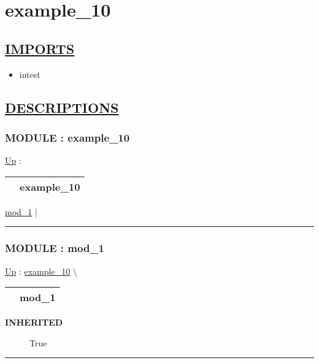 \chapter*{example\_10}
\hypertarget{ecldoc:toc:example_10}{}

\section*{\underline{IMPORTS}}
\begin{itemize}
\item intest
\end{itemize}

\section*{\underline{DESCRIPTIONS}}
\subsection*{MODULE : example\_10}
\hypertarget{ecldoc:example_10}{}
\hyperlink{ecldoc:toc:root}{Up} :

{\renewcommand{\arraystretch}{1.5}
\begin{tabularx}{\textwidth}{|>{\raggedright\arraybackslash}l|X|}
\hline
\hspace{0pt} & example\_10 \\
\hline
\end{tabularx}
}

\par


\hyperlink{ecldoc:intest.Example_3.mod_1}{mod\_1}  |

\rule{\linewidth}{0.5pt}

\subsection*{MODULE : mod\_1}
\hypertarget{ecldoc:intest.Example_3.mod_1}{}
\hyperlink{ecldoc:example_10}{Up} :
\hspace{0pt} \hyperlink{ecldoc:example_10}{example_10} \textbackslash 

{\renewcommand{\arraystretch}{1.5}
\begin{tabularx}{\textwidth}{|>{\raggedright\arraybackslash}l|X|}
\hline
\hspace{0pt} & mod\_1 \\
\hline
\end{tabularx}
}

\par

\par
\begin{description}
\item [\textbf{INHERITED}] True
\end{description}

\rule{\linewidth}{0.5pt}


